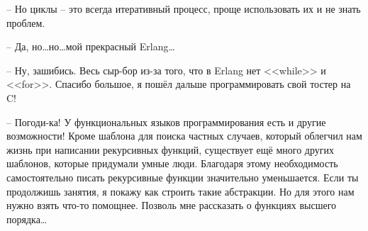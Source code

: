 \--- Но циклы \--- это всегда итеративный процесс, проще использовать их и не знать проблем.

\--- Да, но\ldots но\ldots мой прекрасный Erlang\ldots

\--- Ну, зашибись.
Весь сыр\--бор из\--за того, что в Erlang нет <<while>> и <<for>>.
Спасибо большое, я пошёл дальше программировать свой тостер на C!

\--- Погоди\--ка!
У функциональных языков программирования есть и другие возможности!
Кроме шаблона для поиска частных случаев, который облегчил нам жизнь при написании рекурсивных функций, существует ещё много других шаблонов, которые придумали умные люди.
Благодаря этому необходимость самостоятельно писать рекурсивные функции значительно уменьшается.
Если ты продолжишь занятия, я покажу как строить такие абстракции.
Но для этого нам нужно взять что\--то помощнее.
Позволь мне рассказать о функциях высшего порядка\ldots
